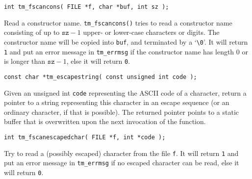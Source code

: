 \begin{verbatim}
int tm_fscancons( FILE *f, char *buf, int sz );
\end{verbatim}
\begin{desc}
Read a constructor name.
\verb+tm_fscancons()+ tries to read a constructor name consisting of up to
$\texttt{sz}-1$ upper- or lower-case characters or digits.
The constructor name will be copied into \texttt{buf},
and terminated by a `\verb+\0+'.
It will return \texttt{1} and put an error message in \texttt{tm\_errmsg}
if the constructor name has length 0 or is longer than $\texttt{sz}-1$,
else it will return \texttt{0}.
\end{desc}
\begin{verbatim}
const char *tm_escapestring( const unsigned int code );
\end{verbatim}
\begin{desc}
Given an unsigned int \verb+code+ representing the ASCII code of a character,
return a pointer to a string representing this character in an
escape sequence (or an ordinary character, if that is possible).
The returned pointer points to a static buffer that is overwritten
upon the next invocation of the function.
\end{desc}
\begin{verbatim}
int tm_fscanescapedchar( FILE *f, int *code );
\end{verbatim}
\begin{desc}
Try to read a (possibly escaped) character from the file \verb'f'. 
It will return \texttt{1} and put an error message in \texttt{tm\_errmsg}
if no escaped character can be read,
else it will return \texttt{0}.
\end{desc}

